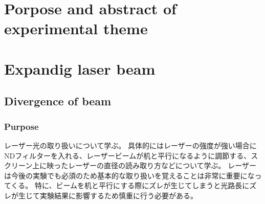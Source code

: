 \documentclass[11pt, a4paper]{jsarticle}
\begin{document}
\section*{Porpose and abstract of experimental theme}

\section{Expandig laser beam}
\subsection{Divergence of beam}
\subsubsection{Purpose}
レーザー光の取り扱いについて学ぶ。
具体的にはレーザーの強度が強い場合にNDフィルターを入れる、レーザービームが机と平行になるように調節する、スクリーン上に映ったレーザーの直径の読み取り方などについて学ぶ。
レーザーは今後の実験でも必須のため基本的な取り扱いを覚えることは非常に重要になってくる。
特に、ビームを机と平行にする際にズレが生じてしまうと光路長にズレが生じて実験結果に影響するため慎重に行う必要がある。
\end{document}
